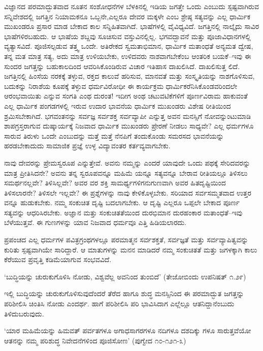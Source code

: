ವಿಜ್ಞಾನದ ಪರಮಾದ್ಭುತವಾದ ನೂತನ ಸಂಶೋಧನೆಗಳ ಬೆಳಕಿನಲ್ಲಿ ಇಡಿಯ ಜಗತ್ತೇ ಒಂದು ಎಂಬುದು ಸ್ಪಷ್ಟವಾಗಿರುವ ಸನ್ನಿವೇಶದಲ್ಲಿ ಜಗತ್ತಿನ ನಿಯಾಮಕನೂ ಒಬ್ಬನೇ,ಎಲ್ಲರೂ ದೇವರ ಮಕ್ಕಳೇ ಎಂಬ ಶ್ರೇಷ್ಠ ಸತ್ಯವನ್ನು ಎಲ್ಲ ಧಾರ್ಮಿಕ ಮುಖಂಡರೂ ಪ್ರಸಾರ ಮಾಡ ಬೇಕಾದ ಕಾಲ ಸನ್ನಿಹಿತವಾಗಿದೆ. ಭಾಷೆಗಳಲ್ಲಿ ವೈವಿಧ್ಯವಿದೆ. ಜಗತ್ತಿನಲ್ಲಿ ನಾಲ್ಕೈದು ಸಾವಿರ ಭಾಷೆಗಳಿರಬಹುದು. ಆ ಭಾಷೆಯ ಶಬ್ದವು ಸೂಚಿಸುವ ವಸ್ತುವಿನಲ್ಲಿಲ್ಲ. ಭಗವದ್ಭಾವನೆ ಮತ್ತು ಪೂಜಾವಿಧಾನಗಳಲ್ಲಿ ವ್ಯತ್ಯಾಸವಿದೆ. ಪೂಜಿಸಲ್ಪಡುವ ತತ್ತ್ವ ಒಂದೇ. ಅತಿರೇಕದ ಸ್ವಮತಾಭಿಮಾನ, ಧಾರ್ಮಿಕ ಮತಾಂಧತೆ ಅನ್ಯಮತ ದ್ವೇಷ, ತನ್ನ ಮತ ಮಾತ್ರ ಸತ್ಯ, ಅದು ಮಾತ್ರ ಉಳಿಯಬೇಕು, ಉಳಿದವರು ನಾಶವಾಗಬೇಕೆಂಬ ಆಂತರಿಕ ಬಯಕೆ–ಇವು ಈ ಸುಂದರ ಜಗತ್ತನ್ನು ಬಹುಕಾಲದಿಂದ ಆವರಿಸಿಕೊಂಡಿರುವ ವಿಚಾರ ಇತಿಹಾಸ ದಾಖಲಿಸಿದೆ. ದಾಖಲಿಸುತ್ತ ಲಿದೆ. ಜಗತ್ತಿನಲ್ಲಿ ಹಿಂಸೆಯ ನರಕಕ್ಕೆ ತಳ್ಳುವ, ರಕ್ತದ ಕಾಲುವೆ ಹರಿಸುವ, ಮಾನವತೆ ಮತ್ತು ಸಂಸ್ಕೃತಿಯನ್ನು ನಾಶಗೊಳಿಸುವ, ಬದುಕನ್ನು ನಿರಾಶೆಯ ಕೂಪಕ್ಕೆ ತಳ್ಳುವ ಧರ್ಮವಿರೋಧೀ ಈ ಕಾರ್ಯಕ್ರಮ ಧಾರ್ಮಿಕರೆನಿಸಿಕೊಂಡವರಿಂದಲೇ ಆರಂಭವಾಯಿತು ಎನ್ನುವ ಸಂಗತಿ ಎಂಥ ದುರಂತ! ಇದೀಗ ಅಂಥ ಚಟುವಟಿಕೆಗಳಿಗೆ ಪೂರ್ಣವಿರಾಮ ಹಾಕುವಂತೆ ಎಲ್ಲ ಧಾರ್ಮಿಕ ಪಂಗಡಗಳಲ್ಲಿ ಇರುವ ಉದಾರ ಭಾವನೆಯ ಧಾರ್ಮಿಕ ಮುಖಂಡರು ವಿಶೇಷ ರೀತಿಯಿಂದ ಶ್ರಮಿಸಬೇಕಾಗಿದೆ. ಭಗವಂತನನ್ನು ಸರ್ವಜ್ಞ ಸರ್ವಶಕ್ತ ಸರ್ವವ್ಯಾಪೀ ಎನ್ನುತ್ತ ಅವನ ಮನಸ್ಸಿಗೆ ನೋವನ್ನುಂಟುಮಾಡಿ ಶಾಪಗ್ರಸ್ತರಾಗುವ ದುಷ್ಕಾರ್ಯಕ್ಕೆ ನಿಜವಾದ ಧಾರ್ಮಿಕ ಮುಖಂಡರು ಪ್ರೇರಣೆ ನೀಡಲು ಸಾಧ್ಯವೇ? ಎಲ್ಲ ಧರ್ಮಗಳೂ ಸಾರುವ ತಿರುಳು ಒಂದೇ ಎಂಬುದನ್ನು ಮತ್ತೆ ಮತ್ತೆ ನೆನಪಿಗೆ ತಂದುಕೊಂಡು ಸಮರಸದ ಭಾವನೆಯನ್ನು ಹರಡಬೇಕಾದುದು ಸಾಮಾಜಿಕ ಪ್ರಜ್ಞೆ ಉಳ್ಳ ವಿದ್ಯಾವಂತರ ಕರ್ತವ್ಯವಾಗಬೇಕು.

ನಾವು ದೇವರನ್ನು ಪ್ರೇಮಸ್ವರೂಪ ಎನ್ನುತ್ತೇವೆ. ಅವನು ನಮ್ಮನ್ನು ಎಂದರೆ ಯಾವುದೇ ಒಂದು ಪಥಕ್ಕೆ ಸೇರಿದವರನ್ನು ಮಾತ್ರ ಪ್ರೀತಿಸಿದನೇ? ಅವನು ತನ್ನ ಸ್ವರೂಪವನ್ನೂ ಮಹಿಮೆ ಯನ್ನೂ ಸತ್ಯವನ್ನೂ ಬೇರಾವ ರೀತಿಯಲ್ಲೂ ತಿಳಿಸಲು ಸಮರ್ಥನಲ್ಲವೇ? ತಿಳಿಸಿಲ್ಲವೇ? ಅವರ ವರ ಶಕ್ತಿ ಸಾಮರ್ಥ್ಯಗಳಿಗನುಗುಣವಾಗಿ ಅವರ ಹಿತದೃಷ್ಟಿಯಿಂದ ತಿಳಿಸಲಾರನೇ? ತಿಳಿಸಲೇ ಇಲ್ಲವೇ? ಈ ಪ್ರಶ್ನೆಗಳನ್ನು ನಾವು ಕೇಳಿಕೊಳ್ಳಬೇಕು. ಸರಿಯಾದ ಸರ್ವಸಮ್ಮತವಾದ ಉತ್ತರ ವನ್ನೂ ಹುಡುಕಬೇಕು. ನಮ್ಮ ಸಂಕುಚಿತ ದೃಷ್ಟಿ ಬದಲಾಗಬೇಕು. ಆ ದೃಷ್ಟಿ ಎಲ್ಲರೂ ಒಪ್ಪಲೇ ಬೇಕಾದ ಪೂರ್ಣ ಸತ್ಯವನ್ನು ಆಧರಿಸಿರಬೇಕು. ಅಜ್ಞಾನ ಮತ್ತು ಸಂಕುಚಿತತೆಯಿಂದ ದುರಭಿಮಾನ ದುರಹಂಕಾರ ಮತಾಂಧತೆ–ಇವು ಬೆಳೆಯುತ್ತವೆ. ಈ ಗುಣಗಳನ್ನು ಯಾವ ನಿಜವಾದ ಧರ್ಮವೂ ಎತ್ತಿ ಹಿಡಿಯಲಾರದು.

ಪ್ರಪಂಚದ ಎಲ್ಲ ಧರ್ಮಗಳ ಪವಿತ್ರಗ್ರಂಥಗಳಲ್ಲೂ ಪರಮಾತ್ಮನ ಸರ್ವಶಕ್ತತೆ, ಸರ್ವಜ್ಞತೆ ಮತ್ತು ಸರ್ವವ್ಯಾಪಿತ್ವವನ್ನು ಕುರಿತು ಸ್ಪಷ್ಟವಾಗಿಯೇ ಸಾರಿದ್ದಾರೆ. ಆ ಮಾತುಗಳನ್ನು ಮನನ ಮಾಡಿದರೆ ನಮ್ಮ ಸಂಕುಚಿತತೆ ಮತ್ತು ಜಗಳಕ್ಕಾಗಿ ಕಾಲು ಕೆರೆಯುವ ಪ್ರವೃತ್ತಿ ಕಡಿಮೆಯಾಗುವ ಸಂಭವವಿದೆ.

‘ಬುದ್ಧಿಯನ್ನು ಚುರುಕುಗೊಳಿಸಿ ನೋಡು, ವಿಶ್ವವೆಲ್ಲ ಅವನಿಂದ ತುಂಬಿದೆ’ (ತೇಜೋಬಿಂದು ಉಪನಿಷತ್ ೧.೨೯)

ಇಲ್ಲಿ ಬುದ್ಧಿಯನ್ನು ಚುರುಕುಗೊಳಿಸುವುದೆಂದರೆ ತೆರೆದ ಹಾಗೂ ಶುದ್ಧ ಮನಸ್ಸಿನಿಂದ ಈ ಪರಮಾದ್ಭುತ ಜಗತ್ತನ್ನು ಪರಿಶೀಲಿಸಿ ಚಿಂತಿಸಿ ನೋಡು ಎಂದರ್ಥ. ಹಾಗೆ ಪರಿಶೀಲಿಸಿ ಪರಿ ಭಾವಿಸಿದಾಗ ಎಲ್ಲೆಲ್ಲೂ ಆತನಿದ್ದಾನೆಂಬುದು ತಿಳಿದುಬರುವುದು.

‘ಯಾರ ಮಹಿಮೆಯನ್ನು ಹಿಮವತ್ ಪರ್ವತಗಳೂ ಅಗಾಧಸಾಗರಗಳೂ ನದಿಗಳೂ ದಶದಿಕ್ಕು ಗಳೂ ಸಾರುತ್ತವೆಯೋ ಆತನನ್ನು ನಮ್ಮ ಪರಿಶುದ್ಧ ನಿವೇದನೆಗಳಿಂದ ಪೂಜಿಸೋಣ’ (ಪುಗ್ವೇದ ೧೦-೧೨೧-೩)

